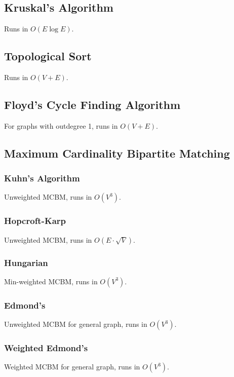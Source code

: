 \documentclass{article}
\begin{document}
\subsection{Kruskal's Algorithm}
Runs in $O(E \log E)$.


\subsection{Topological Sort}
Runs in $O(V + E)$.


\subsection{Floyd's Cycle Finding Algorithm}
For graphs with outdegree 1, runs in $O(V + E)$.


\subsection{Maximum Cardinality Bipartite Matching}
\subsubsection{Kuhn's Algorithm}
Unweighted MCBM, runs in $O(V^3)$.


\subsubsection{Hopcroft-Karp}
Unweighted MCBM, runs in $O(E \cdot \sqrt{V})$.


\subsubsection{Hungarian}
Min-weighted MCBM, runs in $O(V^3)$.


\subsubsection{Edmond's}
Unweighted MCBM for general graph, runs in $O(V^3)$.


\subsubsection{Weighted Edmond's}
Weighted MCBM for general graph, runs in $O(V^3)$.

\end{document}
